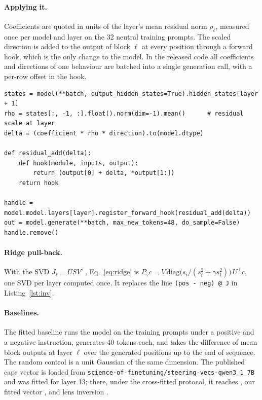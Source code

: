 \documentclass{article}
\begin{document}
\paragraph{Applying it.}
Coefficients are quoted in units of the layer's mean residual norm $\rho_\ell$, measured once per model and layer on the 32 neutral training prompts. The scaled direction is added to the output of block $\ell$ at every position through a forward hook, which is the only change to the model. In the released code all coefficients and directions of one behaviour are batched into a single generation call, with a per-row offset in the hook.

\begin{lstlisting}[caption={Scaling and injection during generation.},label={lst:hook}]
states = model(**batch, output_hidden_states=True).hidden_states[layer + 1]
rho = states[:, -1, :].float().norm(dim=-1).mean()      # residual scale at layer
delta = (coefficient * rho * direction).to(model.dtype)

def residual_add(delta):
    def hook(module, inputs, output):
        return (output[0] + delta, *output[1:])
    return hook

handle = model.model.layers[layer].register_forward_hook(residual_add(delta))
out = model.generate(**batch, max_new_tokens=48, do_sample=False)
handle.remove()
\end{lstlisting}

\paragraph{Ridge pull-back.} With the SVD $J_\ell = U S V^\top$, Eq.~\ref{eq:ridge} is $P_\gamma c = V\,\mathrm{diag}\big(s_i/(s_i^2 + \gamma s_1^2)\big)\,U^\top c$, one SVD per layer computed once. It replaces the line \texttt{(pos - neg) @ J} in Listing~\ref{lst:inv}.

\paragraph{Baselines.}
The fitted baseline runs the model on the training prompts under a positive and a negative instruction, generates 40 tokens each, and takes the difference of mean block outputs at layer $\ell$ over the generated positions up to the end of sequence. The random control is a unit Gaussian of the same dimension. The published caps vector is loaded from \texttt{science-of-finetuning/steering-vecs-qwen3\_1\_7B} and was fitted for layer 13; there, under the cross-fitted protocol, it reaches \CAPSARTIFACT, our fitted vector \CAPSFITTEDTHIRTEEN, and lens inversion \CAPSOURSTHIRTEEN.
\end{document}
